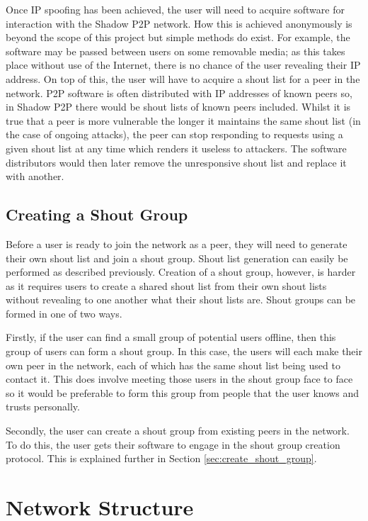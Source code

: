 \documentclass[ %
                    author={Luke Murray},
                supervisor={Dr. Simon Hollis},
                     title={Shadow Peer-to-Peer Networks},
                  subtitle={},
                    degree={MEng},
                      year={2013} ]{thesis}
\begin{document}

Once IP spoofing has been achieved, the user will need to acquire software for interaction with the Shadow P2P network. How this is achieved anonymously is beyond the scope of this project but simple methods do exist. For example, the software may be passed between users on some removable media; as this takes place without use of the Internet, there is no chance of the user revealing their IP address. On top of this, the user will have to acquire a shout list for a peer in the network. P2P software is often distributed with IP addresses of known peers so, in Shadow P2P there would be shout lists of known peers included. Whilst it is true that a peer is more vulnerable the longer it maintains the same shout list (in the case of ongoing attacks), the peer can stop responding to requests using a given shout list at any time which renders it useless to attackers. The software distributors would then later remove the unresponsive shout list and replace it with another. 

\subsection{Creating a Shout Group}

Before a user is ready to join the network as a peer, they will need to generate their own shout list and join a shout group. Shout list generation can easily be performed as described previously. Creation of a shout group, however, is harder as it requires users to create a shared shout list from their own shout lists without revealing to one another what their shout lists are. Shout groups can be formed in one of two ways.

Firstly, if the user can find a small group of potential users offline, then this group of users can form a shout group. In this case, the users will each make their own peer in the network, each of which has the same shout list being used to contact it. This does involve meeting those users in the shout group face to face so it would be preferable to form this group from people that the user knows and trusts personally.

Secondly, the user can create a shout group from existing peers in the network. To do this, the user gets their software to engage in the shout group creation protocol. This is explained further in Section \ref{sec:create_shout_group}.

\section{Network Structure}
\end{document}
